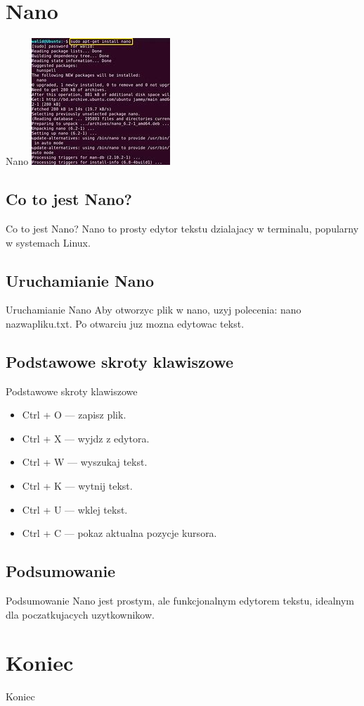 \documentclass{beamer}
\begin{document}
\section{Nano}
\begin{frame}{Nano}
\centering
\includegraphics{nano.png}
\end{frame}

\subsection{Co to jest Nano?}
\begin{frame}{Co to jest Nano?}
Nano to prosty edytor tekstu dzialajacy w terminalu, popularny w systemach Linux.
\end{frame}

\subsection{Uruchamianie Nano}
\begin{frame}{Uruchamianie Nano}
Aby otworzyc plik w nano, uzyj polecenia:
nano nazwapliku.txt.
Po otwarciu juz mozna edytowac tekst.
\end{frame}

\subsection{Podstawowe skroty klawiszowe}
\begin{frame}{Podstawowe skroty klawiszowe}
\begin{itemize}
\item Ctrl + O   — zapisz plik.
\item Ctrl + X   — wyjdz z edytora. 
\item Ctrl + W   — wyszukaj tekst.
\item Ctrl + K   — wytnij tekst.
\item Ctrl + U   — wklej tekst.
\item Ctrl + C   — pokaz aktualna pozycje kursora.
\end{itemize}
\end{frame}

\subsection{Podsumowanie}
\begin{frame}{Podsumowanie}
Nano jest prostym, ale funkcjonalnym edytorem tekstu, idealnym dla poczatkujacych uzytkownikow.
\end{frame}


\section{Koniec}
\begin{frame}
Koniec
\end{frame}
\end{document}
